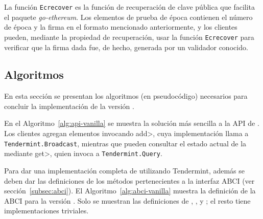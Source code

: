 
La función \texttt{Ecrecover} es la función de recuperación de clave pública que facilita el paquete \textit{go-ethereum}.
%
Los elementos de prueba de época contienen el número de
época y la firma en el formato mencionado anteriormente, y los clientes pueden, mediante la propiedad de recuperación,
usar la función \texttt{Ecrecover} para
verificar que la firma dada fue, de hecho, generada por un validador conocido.
%


\subsection{Algoritmos}

En esta sección se presentan los algoritmos (en pseudocódigo) necesarios para concluir
la implementación de la versión \vanilla.
%


En el Algoritmo~\ref{alg:api-vanilla} se muestra la solución más sencilla a la API
de \setchain.
%
Los clientes agregan elementos invocando \<add>, cuya implementación llama a
\texttt{Tendermint.Broadcast}, mientras que pueden consultar el estado actual de
la \setchain mediante \<get>, quien invoca a \texttt{Tendermint.Query}.
%

Para dar una implementación completa de \setchain utilizando Tendermint, además se
deben dar las definiciones de los métodos pertenecientes a la interfaz ABCI
(ver sección~\ref{subsec:abci}). 
%
El Algoritmo~\ref{alg:abci-vanilla} muestra la definición de la ABCI para la versión
\vanilla.
%
Solo se muestran las definiciones de \CheckTx, \DeliverTx, \EndBlock y \Query;
el resto tiene implementaciones triviales.

